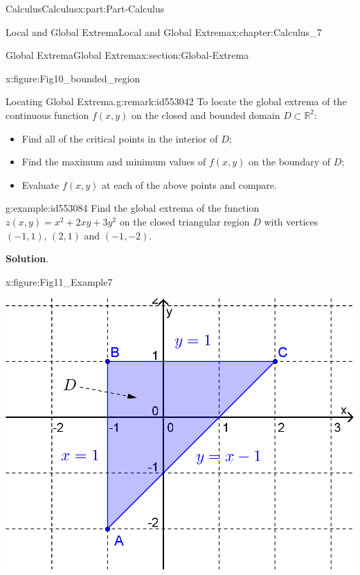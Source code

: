 \documentclass[oneside,10pt,]{book}
\newcommand{\blocktitlefont}{\relax}
\numberwithin{equation}{section}
\begin{document}
\begin{partptx}{Calculus}{}{Calculus}{}{}{x:part:Part-Calculus}
\begin{chapterptx}{Local and Global Extrema}{}{Local and Global Extrema}{}{}{x:chapter:Calculus_7}
\begin{sectionptx}{Global Extrema}{}{Global Extrema}{}{}{x:section:Global-Extrema}
\begin{figureptx}{}{x:figure:Fig10_bounded_region}{}
\begin{image}{0.275}{0.45}{0.275}
\end{image}%
\tcblower
\end{figureptx}%
\begin{remark}{Locating Global Extrema.}{g:remark:id553042}%
To locate the global extrema of the continuous function \(f(x,y)\) on the closed and bounded domain \(D \subset \mathbb{R}^2\):%
\par
%
\begin{itemize}[label=\textbullet]
\item{}Find all of the critical points in the interior of \(D\);%
\item{}Find the maximum and minimum values of \(f(x,y)\) on the boundary of \(D\);%
\item{}Evaluate \(f(x,y)\) at each of the above points and compare.%
\end{itemize}
%
\end{remark}
\begin{example}{}{g:example:id553084}%
Find the global extrema of the function \(z(x,y) = x^2 + 2xy + 3y^2\) on the closed triangular region \(D\) with vertices \((-1,1)\), \((2,1)\) and \((-1,-2)\).%
\par\smallskip%
\noindent\textbf{\blocktitlefont Solution}.\hypertarget{g:solution:id553142}{}\quad{}\begin{figureptx}{}{x:figure:Fig11_Example7}{}%
\begin{image}{0.2}{0.6}{0.2}%
\includegraphics[width=\linewidth]{./Calculus/Images/7/Fig11_Example7.png}
\end{image}%
\tcblower
\end{figureptx}%

\end{example}
\end{sectionptx}
\end{chapterptx}
\end{partptx}
\end{document}
